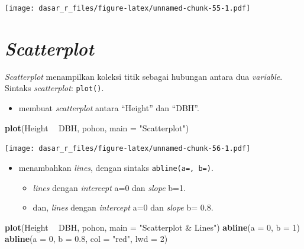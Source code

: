 \documentclass[
  12pt,
  a4paper,
]{scrbook}
\newenvironment{Shaded}{\begin{snugshade}}{\end{snugshade}}
\newcommand{\DataTypeTok}[1]{\textcolor[rgb]{0.13,0.29,0.53}{#1}}
\newcommand{\DecValTok}[1]{\textcolor[rgb]{0.00,0.00,0.81}{#1}}
\newcommand{\FloatTok}[1]{\textcolor[rgb]{0.00,0.00,0.81}{#1}}
\newcommand{\KeywordTok}[1]{\textcolor[rgb]{0.13,0.29,0.53}{\textbf{#1}}}
\newcommand{\NormalTok}[1]{#1}
\newcommand{\OperatorTok}[1]{\textcolor[rgb]{0.81,0.36,0.00}{\textbf{#1}}}
\newcommand{\StringTok}[1]{\textcolor[rgb]{0.31,0.60,0.02}{#1}}
\providecommand{\tightlist}{%
  \setlength{\itemsep}{0pt}\setlength{\parskip}{0pt}}
\begin{document}
\texttt{[image: dasar\_r\_files/figure-latex/unnamed-chunk-55-1.pdf]}

\newpage

\hypertarget{scatterplot}{%
\section{\texorpdfstring{\emph{Scatterplot}}{Scatterplot}}\label{scatterplot}}

\emph{Scatterplot} menampilkan koleksi titik sebagai hubungan antara dua
\emph{variable}. Sintaks \emph{scatterplot}: \texttt{plot()}.

\begin{itemize}
\tightlist
\item
  membuat \emph{scatterplot} antara ``Height'' dan ``DBH''.
\end{itemize}

\begin{Shaded}
\begin{Highlighting}[]
\KeywordTok{plot}\NormalTok{(Height }\OperatorTok{~}\StringTok{ }\NormalTok{DBH, pohon, }\DataTypeTok{main =} \StringTok{"Scatterplot"}\NormalTok{)}
\end{Highlighting}
\end{Shaded}

\texttt{[image: dasar\_r\_files/figure-latex/unnamed-chunk-56-1.pdf]}

\begin{itemize}
\tightlist
\item
  menambahkan \emph{lines}, dengan sintaks \texttt{abline(a=,\ b=)}.

  \begin{itemize}
  \tightlist
  \item
    \emph{lines} dengan \emph{intercept} a=0 dan \emph{slope} b=1.
  \item
    dan, \emph{lines} dengan \emph{intercept} a=0 dan \emph{slope} b=
    0.8.
  \end{itemize}
\end{itemize}

\begin{Shaded}
\begin{Highlighting}[]
\KeywordTok{plot}\NormalTok{(Height }\OperatorTok{~}\StringTok{ }\NormalTok{DBH, pohon, }\DataTypeTok{main =} \StringTok{"Scatterplot & Lines"}\NormalTok{)}
\KeywordTok{abline}\NormalTok{(}\DataTypeTok{a =} \DecValTok{0}\NormalTok{, }\DataTypeTok{b =} \DecValTok{1}\NormalTok{)}
\KeywordTok{abline}\NormalTok{(}\DataTypeTok{a =} \DecValTok{0}\NormalTok{, }\DataTypeTok{b =} \FloatTok{0.8}\NormalTok{, }\DataTypeTok{col =} \StringTok{"red"}\NormalTok{, }\DataTypeTok{lwd =} \DecValTok{2}\NormalTok{)}
\end{Highlighting}
\end{Shaded}
\end{document}
